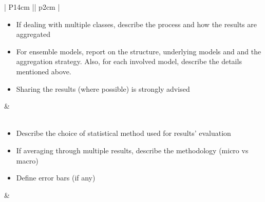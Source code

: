 \begin{table}[ht]
\begin{tabular}{| P{14cm} || p{2cm} |}
\begin{itemize}
{                any involved parameter(s), the process and how it has been applied to the project's data}
                \item
                {\small If dealing with multiple classes, describe the process and how the results are aggregated}
                \item
                {\small For ensemble models, report on the structure, underlying models and and the aggregation strategy. Also,
                for each involved model, describe the details mentioned above.}
                \item
                {\small Sharing the results (where possible) is strongly advised}
            \end{itemize}&\\
    
        \hline
        \\ 
        \hline
            \begin{itemize}
                \item
                {\small Describe the choice of statistical method used for results' evaluation}
                \item
                {\small If averaging through multiple results, describe the methodology (micro vs macro)}
                \item
                {\small Define error bars (if any)}
            \end{itemize}&\\
        \hline

    \end{tabular}
    \captionsetup{font=small,width=12cm}
    \caption{Reproducible experiment report checklist}
    \label{tab:table3}
    
\end{table}

